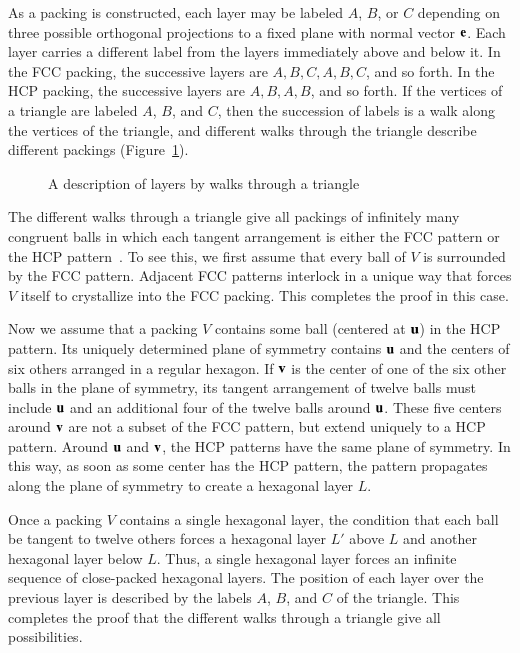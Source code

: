As a packing is constructed, each layer may be labeled
$A$, $B$, or $C$ depending on three possible orthogonal projections to a fixed plane
with normal vector ${\mathbf e}$.
Each layer carries a different label from the layers immediately
above and below it.  In the FCC packing, the successive layers are
$A,B,C,A,B,C$, and so forth.  In the HCP packing, the successive layers are
$A,B,A,B$, and so forth.  If the vertices of a triangle are labeled $A$, $B$, and $C$,
then the succession of labels is a
walk along the vertices of the triangle, and different walks through the
triangle describe different packings (Figure~\ref{fig:fcc-tri}).

\begin{figure}[htb]
  \centering
  \caption{A description of layers by walks through a triangle}
  \label{fig:fcc-tri}
\end{figure}

The different walks through a triangle give all packings of infinitely
many congruent balls in which each tangent arrangement is
either the FCC pattern  or the HCP pattern~\cite{CoSl95}.  To see
this, we first assume that every ball of $V$ is surrounded by the FCC pattern.  
Adjacent FCC patterns interlock in a unique way
that forces $V$ itself to crystallize into the
FCC packing.  This completes the proof in this case.

Now we assume that a packing $V$ contains some ball (centered at ${\mathbf u}$)
in the HCP pattern. Its uniquely determined
plane of symmetry contains ${\mathbf u}$ and the centers of six
others arranged in a regular hexagon. If ${\mathbf v}$ is the center of one of
the six other balls in the plane of symmetry, its  tangent arrangement
of twelve balls must include ${\mathbf u}$ and an additional four of the
twelve balls around ${\mathbf u}$. These five centers around ${\mathbf v}$ are not a
subset of the FCC pattern, but  extend uniquely to
a HCP pattern.   Around ${\mathbf u}$ and ${\mathbf v}$, the HCP patterns  have the same
plane of symmetry. In this way, as
soon as some center has the HCP pattern, the pattern
propagates along the plane of symmetry to create a hexagonal layer
$L$.

Once a packing $V$ contains a single hexagonal layer, the condition
that each ball be tangent to twelve others forces a hexagonal layer
$L'$ above $L$ and another hexagonal layer below $L$.  Thus, a single
hexagonal layer forces an infinite sequence of close-packed hexagonal
layers.  The position of each layer over the previous layer is described 
by the labels $A$, $B$, and $C$ of the triangle.
This completes the proof that the different walks through a triangle give
all possibilities.



